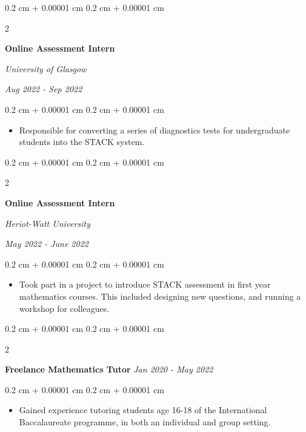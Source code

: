 \documentclass[10pt, letterpaper]{article}
\newenvironment{highlights}{
    \begin{itemize}[
        topsep=0.10 cm,
        parsep=0.10 cm,
        partopsep=0pt,
        itemsep=0pt,
        leftmargin=0.4 cm + 10pt
    ]
}{
    \end{itemize}
} %
\newenvironment{onecolentry}{
    \begin{adjustwidth}{
        0.2 cm + 0.00001 cm
    }{
        0.2 cm + 0.00001 cm
    }
}{
    \end{adjustwidth}
} %
\newenvironment{twocolentry}[2][]{
    \onecolentry
    \def\secondColumn{#2}
    \setcolumnwidth{\fill, 4.5 cm}
    \begin{paracol}{2}
}{
    \switchcolumn \raggedleft \secondColumn
    \end{paracol}
    \endonecolentry
} %
\begin{document}
        \vspace{0.2 cm}

        \begin{twocolentry}{
        \textit{Aug 2022 - Sep 2022}}
            \textbf{Online Assessment Intern}
            
            \textit{University of Glasgow}
        \end{twocolentry}

        \vspace{0.10 cm}
        \begin{onecolentry}
            \begin{highlights}
                \item Responsible for converting a series of diagnostics tests for undergraduate students into the STACK system.
            \end{highlights}
        \end{onecolentry}

        \vspace{0.2 cm}

        \begin{twocolentry}{
        \textit{May 2022 - June 2022}}
            \textbf{Online Assessment Intern}
            
            \textit{Heriot-Watt University}
        \end{twocolentry}

        \vspace{0.10 cm}
        \begin{onecolentry}
            \begin{highlights}
                \item Took part in a project to introduce STACK assessment in first year mathematics courses. This included designing new questions, and running a workshop for colleagues.
            \end{highlights}
        \end{onecolentry}


        \vspace{0.2 cm}

        \begin{twocolentry}{
        \textit{Jan 2020 - May 2022}}
            \textbf{Freelance Mathematics Tutor}        \end{twocolentry}

        \vspace{0.10 cm}
        \begin{onecolentry}
            \begin{highlights}
                \item Gained experience tutoring students age 16-18 of the International Baccalaureate programme, in both an individual and group setting.
            \end{highlights}
        \end{onecolentry}
\end{document}
